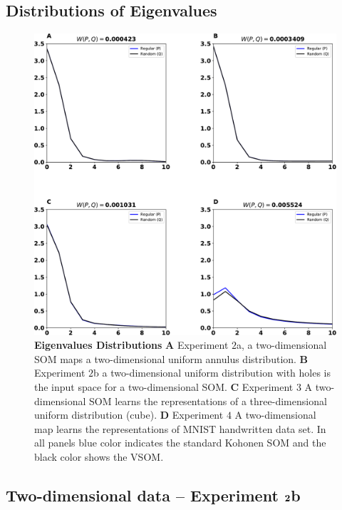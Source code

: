 \subsection{Distributions of Eigenvalues}

\begin{figure}[!htpb]
     \centering
     \includegraphics[width=\textwidth]{figures/eig-distributions.pdf}
     \caption{{\bfseries \sffamily Eigenvalues Distributions}
     {\bfseries \sffamily A} Experiment $2$a, a two-dimensional SOM
     maps a two-dimensional uniform annulus distribution\@.
     {\bfseries \sffamily B} Experiment $2$b a two-dimensional uniform
     distribution with holes is the input space for a two-dimensional SOM\@. 
     {\bfseries \sffamily C} Experiment $3$ A two-dimensional SOM learns the
     representations of a three-dimensional uniform distribution (cube).
     {\bfseries \sffamily D} Experiment $4$ A two-dimensional map learns
     the representations of MNIST handwritten data set.
     In all panels blue color indicates the standard Kohonen SOM and the 
     black color shows the VSOM.}%
     \label{Fig:distributions}
\end{figure}


\subsection{Two-dimensional data -- Experiment ${\bf 2}$b}

